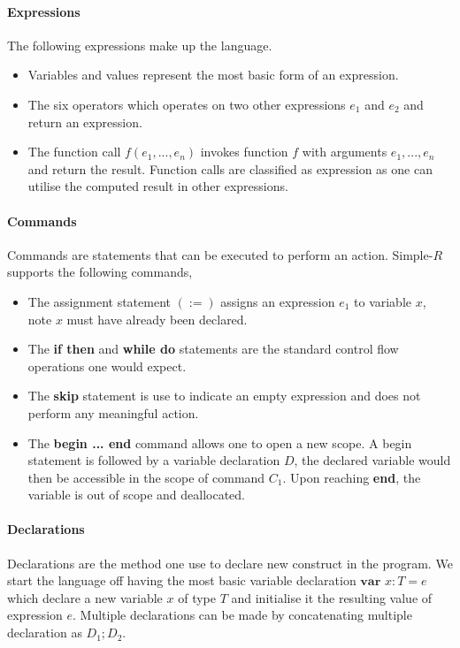\documentclass[a4paper,12pt]{report}
\begin{document}
\paragraph{Expressions} The following expressions make up the language.
\begin{itemize}
  \item Variables and values represent the most basic form of an expression.
  \item The six operators which operates on two other expressions $e_1$ 
  and $e_2$ and return an expression.
  \item The function call $f(e_1,...,e_n)$ invokes function $f$ with arguments 
  $e_1,...,e_n$ and return the result. Function calls are classified as expression as 
  one can utilise the computed result in other expressions. 
\end{itemize}

\paragraph{Commands} Commands are statements that can be executed to perform an 
action. Simple-$R$ supports the following commands,
\begin{itemize}
  \item The assignment statement $(:=)$ assigns an expression $e_1$ to variable 
  $x$, note $x$ must have already been declared. 
  \item The \textbf{if then} and \textbf{while do} statements are the standard 
  control flow operations one would expect.
  \item The \textbf{skip} statement is use to indicate an empty expression and 
  does not perform any meaningful action. 
  \item The \textbf{begin ... end} command allows one to open a new scope. A 
  begin statement is followed by a variable declaration $D$, the declared 
  variable would then be accessible in the scope of command $C_1$. Upon reaching 
  \textbf{end}, the variable is out of scope and deallocated. 
\end{itemize}

\paragraph{Declarations} Declarations are the method one use to declare new construct 
in the program. We start the language off having the most basic variable declaration 
$\textbf{var }x : T = e$ which declare a new variable $x$ of type $T$ and 
initialise it the resulting value of expression $e$. Multiple declarations can 
be made by concatenating multiple declaration as $D_1;D_2$.
\end{document}
